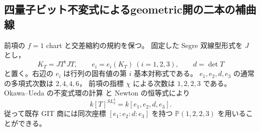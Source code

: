 
\subsection{四量子ビット不変式によるgeometric開の二本の補曲線}
\label{subsec:qa-cubic-geometric-open-invariants}

前項の $f=1$ chart と交差縮約の規約を保つ。
固定した Segre 双線型形式を $J$ とし，
\[
 K_T=JT^{\mathrm t}JT,\qquad
 e_i=e_i(K_T)\ (i=1,2,3),\qquad d=\det T
\]
と置く。右辺の $e_i$ は行列の固有値の第 $i$ 基本対称式である。
$e_1,e_2,d,e_3$ の通常の多項式次数は $2,4,4,6$，
前項の指標 $\chi$ による次数は $1,2,2,3$ である。
Okawa--Ueda の不変式環の計算
\cite[\S3, (3.9)--(3.16)]{OU2014} と Newton の恒等式により
\[
 k[T]^{SL_2^4}=k[e_1,e_2,d,e_3].
 \tag{CI}\label{eq:qa-cubic-elementary-invariant-ring}
\]
従って既存 GIT 商には同次座標
$[e_1:e_2:d:e_3]$ を持つ
$\mathbb P(1,2,2,3)$ を用いることができる。

